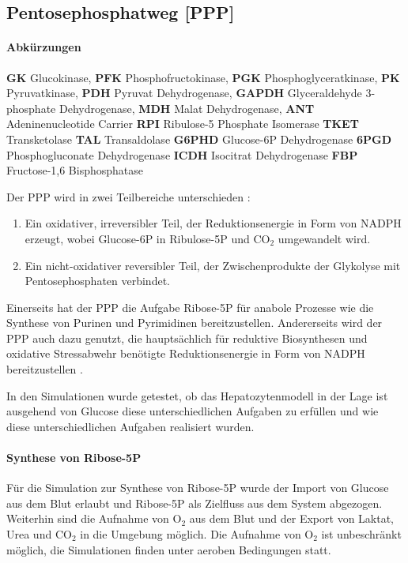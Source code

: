 \clearpage
\subsection{Pentosephosphatweg [PPP]}
\paragraph{Abkürzungen}
  \small
  \textbf{GK} Glucokinase,
  \textbf{PFK} Phosphofructokinase,
  \textbf{PGK} Phosphoglyceratkinase,
  \textbf{PK} Pyruvatkinase,
  \textbf{PDH} Pyruvat Dehydrogenase,
  \textbf{GAPDH} Glyceraldehyde 3-phosphate Dehydrogenase,
  \textbf{MDH} Malat Dehydrogenase,
  \textbf{ANT} Adeninenucleotide Carrier
  \textbf{RPI} Ribulose-5 Phosphate Isomerase 
  \textbf{TKET} Transketolase
  \textbf{TAL} Transaldolase 
  \textbf{G6PHD} Glucose-6P Dehydrogenase
  \textbf{6PGD} Phosphogluconate Dehydrogenase
  \textbf{ICDH} Isocitrat Dehydrogenase
  \textbf{FBP} Fructose-1,6 Bisphosphatase
  \normalsize

Der PPP wird in zwei Teilbereiche unterschieden \cite{Wamelink2008, Nelson2008}: 
\begin{enumerate}
 \item Ein oxidativer, irreversibler Teil, der Reduktionsenergie in Form von NADPH erzeugt, wobei Glucose-6P in Ribulose-5P und $\text{CO}_2$ umgewandelt wird.
 \item Ein nicht-oxidativer reversibler Teil, der Zwischenprodukte der Glykolyse mit Pentosephosphaten verbindet.
\end{enumerate}

Einerseits hat der PPP die Aufgabe Ribose-5P für anabole Prozesse wie die Synthese von Purinen und Pyrimidinen bereitzustellen. Andererseits wird der PPP auch dazu genutzt, die hauptsächlich für reduktive Biosynthesen und oxidative Stressabwehr benötigte Reduktionsenergie in Form von NADPH bereitzustellen \cite{Nelson2008, Pollak2007}.

In den Simulationen wurde getestet, ob das Hepatozytenmodell in der Lage ist ausgehend von Glucose diese unterschiedlichen Aufgaben zu erfüllen und wie diese unterschiedlichen Aufgaben realisiert wurden.

\paragraph{Synthese von Ribose-5P}
Für die Simulation zur Synthese von Ribose-5P wurde der Import von Glucose aus dem Blut erlaubt und Ribose-5P als Zielfluss aus dem System abgezogen. Weiterhin sind die Aufnahme von $\text{O}_2$ aus dem Blut und der Export von Laktat, Urea und $\text{CO}_2$ in die Umgebung möglich. Die Aufnahme von $\text{O}_2$ ist unbeschränkt möglich, die Simulationen finden unter aeroben Bedingungen statt. 

